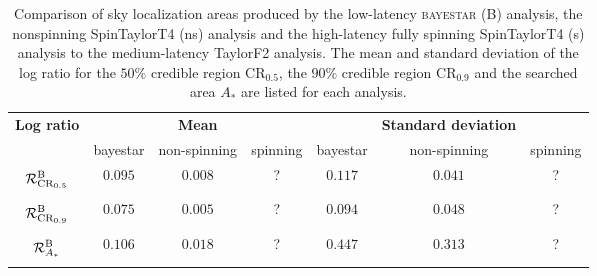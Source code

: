 \begin{table}
\begin{tabular}{ccccccc}
\textbf{Log ratio} & & \textbf{Mean} & & & \textbf{Standard deviation} & \\   
 & bayestar & non-spinning & spinning & bayestar & non-spinning & spinning \\
$\displaystyle \vphantom{\frac{0}{0}} \mathcal{R}^\mathrm{B}_{\mathrm{CR}_{0.5}}$ & $0.095$ & $0.008$ & ? & $0.117$ & $0.041$ & ? \\
$\displaystyle \vphantom{\frac{0}{0}} \mathcal{R}^\mathrm{B}_{\mathrm{CR}_{0.9}}$ & $0.075$ & $0.005$ & ? & $0.094$ & $0.048$ & ? \\
$\displaystyle \vphantom{\frac{0}{0}} \mathcal{R}^\mathrm{B}_{A_\ast}$ & $0.106$ & $0.018$ & ? & $0.447$ & $0.313$ & ?
\end{tabular}
\caption{\label{tab:sky-ratio} Comparison of sky localization areas produced by the low-latency \textsc{bayestar} (B) analysis, the nonspinning SpinTaylorT4 (ns) analysis and the high-latency fully spinning SpinTaylorT4 (s) analysis to the medium-latency TaylorF2 analysis. The mean and standard deviation of the log ratio for the $50\%$ credible region $\mathrm{CR}_{0.5}$, the $90\%$ credible region $\mathrm{CR}_{0.9}$ and the searched area $A_\ast$ are listed for each analysis.}

\end{table}